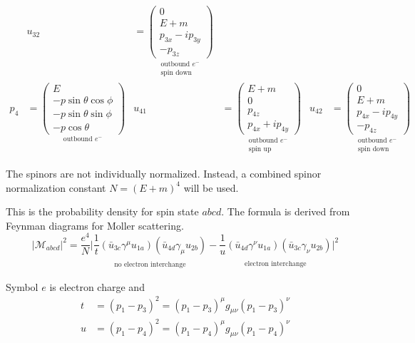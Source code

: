\documentclass[12pt]{article}
\begin{document}
\begin{align*}
& u_{32}&=\underset{\substack{\text{outbound $e^-$}\\\text{spin down}}}
{\begin{pmatrix}0\\E+m\\p_{3x}-ip_{3y}\\-p_{3z}\end{pmatrix}}
\\[1ex]
p_4&=\underset{\text{outbound $e^-$}}
{\begin{pmatrix}
E\\
-p\sin\theta\cos\phi\\
-p\sin\theta\sin\phi\\
-p\cos\theta
\end{pmatrix}}
& u_{41}&=\underset{\substack{\text{outbound $e^-$}\\\text{spin up}}}
{\begin{pmatrix}E+m\\0\\p_{4z}\\p_{4x}+ip_{4y}\end{pmatrix}}
& u_{42}&=\underset{\substack{\text{outbound $e^-$}\\\text{spin down}}}
{\begin{pmatrix}0\\E+m\\p_{4x}-ip_{4y}\\-p_{4z}\end{pmatrix}}
\end{align*}
\fi

The spinors are not individually normalized.
Instead, a combined spinor normalization constant $N=(E+m)^4$ will be used.

\bigskip
This is the probability density for spin state $abcd$.
The formula is derived from Feynman diagrams for Moller scattering.
\begin{equation*}
|\mathcal{M}_{abcd}|^2=\frac{e^4}{N}
\bigg|
\underset{\substack{\\[1ex]\text{no electron interchange}}}
{\frac{1}{t}(\bar{u}_{3c}\gamma^\mu u_{1a})(\bar{u}_{4d}\gamma_\mu u_{2b})}
-
\underset{\substack{\\[1ex]\text{electron interchange}}}
{\frac{1}{u}(\bar{u}_{4d}\gamma^\nu u_{1a})(\bar{u}_{3c}\gamma_\nu u_{2b})}
\bigg|^2
\end{equation*}

Symbol $e$ is electron charge and
\begin{align*}
t&=(p_1-p_3)^2=(p_1-p_3)^\mu g_{\mu\nu}(p_1-p_3)^\nu
\\
u&=(p_1-p_4)^2=(p_1-p_4)^\mu g_{\mu\nu}(p_1-p_4)^\nu
\end{align*}
\end{document}
